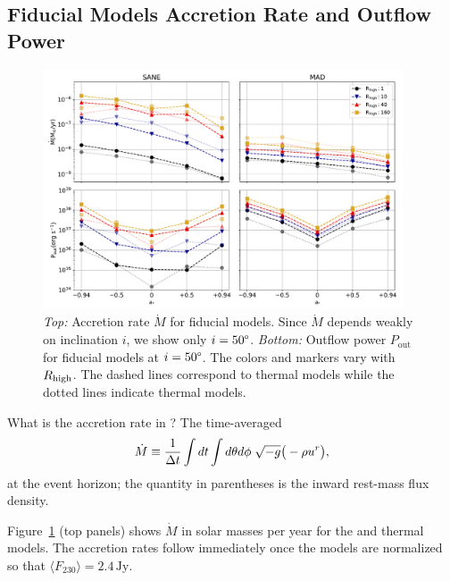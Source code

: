 \subsection{Fiducial Models Accretion Rate and Outflow Power}
\label{sec:accrate_outflowpower}

\begin{figure}
  \centering
  \includegraphics[width=0.95\textwidth]{figures/bhac_kharma_average_mdot_pout.pdf}
  \caption{{\it Top:} Accretion rate $\dot{M}$ for fiducial models.
    Since $\dot{M}$ depends weakly on inclination $i$, we show only $i=50\degree$.
    {\it Bottom:} Outflow power $P_\mathrm{out}$ for fiducial models at $i = 50\degree$.
    The colors and markers vary with $R_\mathrm{high}$.
    The dashed lines correspond to \kharma thermal models while the dotted lines indicate \bhac thermal models.}
  \label{fig:accretion_outflow_power_illinois_thermal}
\end{figure}

What is the accretion rate in \sgra?  The time-averaged 
\begin{equation}
  \dot{M} \equiv \frac{1}{\Delta t}\int dt\int d\theta d\phi\hspace{0.1cm}\sqrt{-g}\big(-\rho u^{r}\big),
\end{equation}
at the event horizon; the quantity in parentheses is the inward rest-mass flux density.

Figure~\ref{fig:accretion_outflow_power_illinois_thermal} (top panels) shows $\dot{M}$ in solar masses per year for the \kharma and \bhac thermal models.
The accretion rates follow immediately once the models are normalized so that $\langle F_{230}\rangle = 2.4\,\mathrm{Jy}$.

